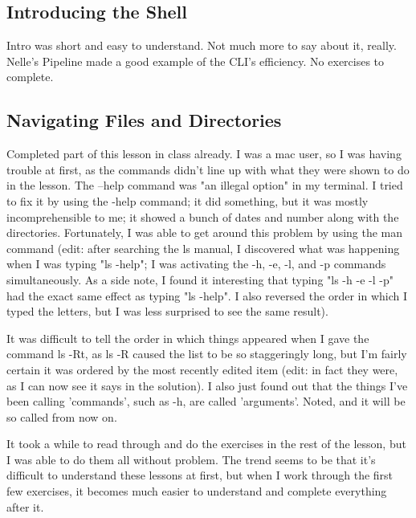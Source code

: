 \documentclass{article}
\begin{document}
\subsection{Introducing the Shell}
Intro was short and easy to understand. Not much more to say about it, really. Nelle's Pipeline made a good example of the CLI's efficiency. No exercises to complete.

\subsection{Navigating Files and Directories}
Completed part of this lesson in class already. I was a mac user, so I was having trouble at first, as the commands didn't line up with what they were shown to do in the lesson. The --help command was "an illegal option" in my terminal. I tried to fix it by using the -help command; it did something, but it was mostly incomprehensible to me; it showed a bunch of dates and number along with the directories. Fortunately, I was able to get around this problem by using the man command (edit: after searching the ls manual, I discovered what was happening when I was typing "ls -help"; I was activating the -h, -e, -l, and -p commands simultaneously. As a side note, I found it interesting that typing "ls -h -e -l -p" had the exact same effect as typing "ls -help". I also reversed the order in which I typed the letters, but I was less surprised to see the same result).

It was difficult to tell the order in which things appeared when I gave the command ls -Rt, as ls -R caused the list to be so staggeringly long, but I'm fairly certain it was ordered by the most recently edited item (edit: in fact they were, as I can now see it says in the solution). I also just found out that the things I've been calling 'commands', such as -h, are called 'arguments'. Noted, and it will be so called from now on.

It took a while to read through and do the exercises in the rest of the lesson, but I was able to do them all without problem. The trend seems to be that it's difficult to understand these lessons at first, but when I work through the first few exercises, it becomes much easier to understand and complete everything after it.
\end{document}
